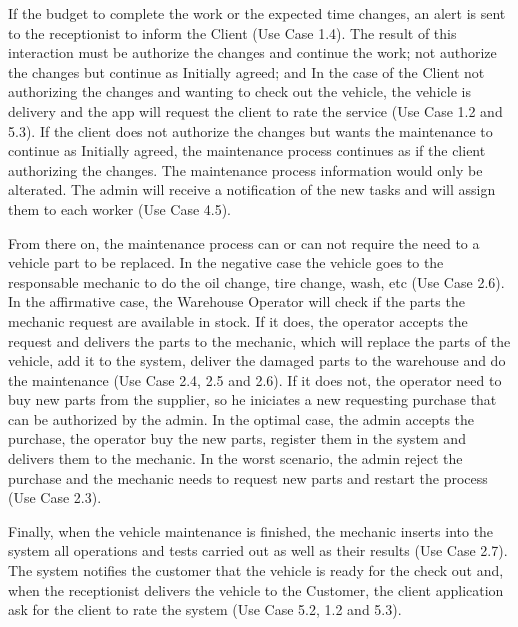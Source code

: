 If the budget to complete the work or the expected time changes, an alert is sent to the receptionist to inform the Client (Use Case 1.4). 
The result of this interaction must be authorize the changes and continue the work; not authorize the changes but continue as Initially agreed; and 
In the case of the Client not authorizing the changes and wanting to check out the vehicle, the vehicle is delivery and the app will request the client to rate the service (Use Case 1.2 and 5.3). 
If the client does not authorize the changes but wants the maintenance to continue as Initially agreed, the maintenance process continues as if the client authorizing the changes. 
The maintenance process information would only be alterated.
The admin will receive a notification of the new tasks and will assign them to each worker (Use Case 4.5).

From there on, the maintenance process can or can not require the need to a vehicle part to be replaced. 
In the negative case the vehicle goes to the responsable mechanic to do the oil change, tire change, wash, etc (Use Case 2.6). 
In the affirmative case, the Warehouse Operator will check if the parts the mechanic request are available in stock. 
If it does, the operator accepts the request and delivers the parts to the mechanic, which will replace the parts of the vehicle, add it to the system, deliver the damaged parts to the warehouse and do the maintenance (Use Case 2.4, 2.5 and 2.6). 
If it does not, the operator need to buy new parts from the supplier, so he iniciates a new requesting purchase that can be authorized by the admin. 
In the optimal case, the admin accepts the purchase, the operator buy the new parts, register them in the system and delivers them to the mechanic. 
In the worst scenario, the admin reject the purchase and the mechanic needs to request new parts and restart the process (Use Case 2.3).    

Finally, when the vehicle maintenance is finished, the mechanic inserts into the system all operations and tests carried out as well as their results (Use Case 2.7). 
The system notifies the customer that the vehicle is ready for the check out and, when the receptionist delivers the vehicle to the Customer, the client application ask for the client to rate the system (Use Case 5.2, 1.2 and 5.3).


